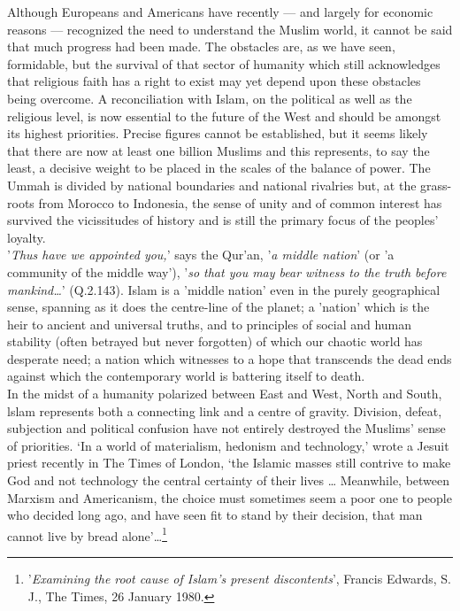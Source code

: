 \documentclass[10pt, twoside,openright]{book}
\begin{document}
Although Europeans and Americans have recently --- and largely for economic reasons --- recognized the need to understand the Muslim world, it cannot be said that much progress had been made. The obstacles are, as we have seen, formidable, but the survival of that sector of humanity which still acknowledges that religious faith has a right to exist may yet depend upon these obstacles being overcome. A reconciliation with Islam, on the political as well as the religious level, is now essential to the future of the West and should be amongst its highest priorities. Precise figures cannot be established, but it seems likely that there are now at least one billion Muslims and this represents, to say the least, a decisive weight to be placed in the scales of the balance of power. The Ummah is divided by national boundaries and national rivalries but, at the grass\hyp{}roots from Morocco to Indonesia, the sense of unity and of common interest has survived the vicissitudes of history and is still the primary focus of the peoples' loyalty. \\

'\emph{Thus have we appointed you,}' says the Qur'an, '\emph{a middle nation}' (or 'a community of the middle way'), '\emph{so that you may bear witness to the truth before mankind\ldots}' (Q.2.143). Islam is a 'middle nation' even in the purely geographical sense, spanning as it does the centre\hyp{}line of the planet; a 'nation' which is the heir to ancient and universal truths, and to principles of social and human stability (often betrayed but never forgotten) of which our chaotic world has desperate need; a nation which witnesses to a hope that transcends the dead ends against which the contemporary world is battering itself to death. \\

In the midst of a humanity polarized between East and West, North and South, lslam represents both a connecting link and a centre of gravity. Division, defeat, subjection and political confusion have not entirely destroyed the Muslims' sense of priorities. `In a world of materialism, hedonism and technology,' wrote a Jesuit priest recently in The Times of London, `the Islamic masses still contrive to make God and not technology the central certainty of their lives \ldots{} Meanwhile, between Marxism and Americanism, the choice must sometimes seem a poor one to people who decided long ago, and have seen fit to stand by their decision, that man cannot live by bread alone'\ldots{}\footnote{'\emph{Examining the root cause of Islam's present discontents}', Francis Edwards, S. J., The Times, 26 January 1980.}\\
\end{document}
